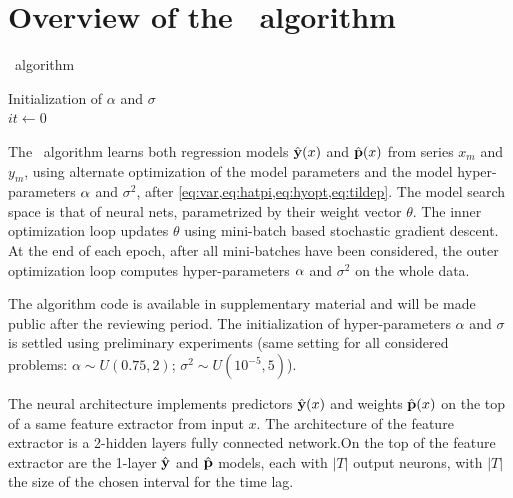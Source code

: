 \section{Overview of the \XX\ algorithm}\label{sec:model}
\begin{algorithm}[H]
  \SetAlgoLined
   \caption{\XX\ algorithm}
   Initialization of $\alpha$ and $\sigma$\\
   $it \longleftarrow 0$ \;
\end{algorithm}
 The \XX\ algorithm learns both regression models $\hat {\bf y}(x)$ and $\hat {\bf p}(x)$ from series $x_m$ and $y_m$, using alternate optimization of the model parameters and the model hyper-parameters ${\bf \alpha}$ and $\sigma^2$, after \cref{eq:var,eq:hatpi,eq:hyopt,eq:tildep}. The model search space is that of neural nets, parametrized by their weight vector $\theta$. The inner optimization loop updates $\theta$ using mini-batch based stochastic gradient descent. At the end of each epoch, after all mini-batches have been considered, the outer optimization loop computes hyper-parameters ${\bf \alpha}$ and $\sigma^2$ on the whole data. 
 
 The algorithm code is available in supplementary material and will be made public after the reviewing period.
The initialization of hyper-parameters $\alpha$ and $\sigma$ is settled using preliminary experiments (same setting for all considered problems: $\alpha \sim U(0.75, 2)$; $\sigma^2 \sim U(10^{-5}, 5)$).

The neural architecture implements predictors $\hat {\bf y}(x)$ and weights $\hat {\bf p}(x)$ on the top of a same feature extractor from input $x$. %
The architecture of the feature extractor is a 2-hidden layers fully connected network.On the top of the feature extractor are the 1-layer $\hat {\bf y}$ and $\hat {\bf p}$ models, each with $|T|$ output neurons, with $|T|$ the size of the chosen interval for the time lag.


